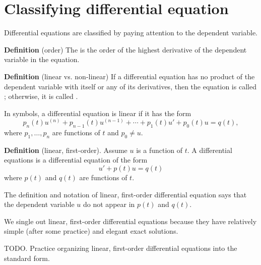 \documentclass[../main.tex]{subfiles}
\begin{document}
 \section{Classifying differential equation}

Differential equations are classified by paying attention to the dependent variable. 

\begin{mdframed}[style=simple-compact]
  \textbf{Definition} (order) The  is the order of the highest derivative of the dependent variable in the equation.
\end{mdframed}

\begin{mdframed}[style=simple-compact]
  \textbf{Definition} (linear vs. non-linear) If a differential equation has no product of the dependent variable with itself or any of its derivatives, then the equation is called ; otherwise, it is called . 

  In symbols, a differential equation is linear if it has the form
  \[
    p_{n}(t) u^{(n)} + p_{n-1}(t) u^{(n-1)} + \cdots + p_{1}(t) u' + p_{0}(t) u = q(t),
  \]
  where \(p_{1}, \ldots, p_{n}\) are functions of \(t\) and \(p_{0} \ne u\).
\end{mdframed}

\begin{mdframed}[style=simple-compact]
  \textbf{Definition} (linear, first-order). Assume \(u\) is a function of \(t\). A  differential equations is a differential equation of the form
  \[
    u' + p(t) u = q(t)
  \]
  where \(p(t)\) and \(q(t)\) are functions of \(t\).
\end{mdframed}

\faPencil*{} The definition and notation of linear, first-order differential equation says that the dependent variable \(u\) do not appear in \(p(t)\) and \(q(t)\).

We single out linear, first-order differential equations because they have relatively simple (after some practice) and elegant exact solutions. 

TODO. Practice organizing linear, first-order differential equations into the standard form.
\end{document}
